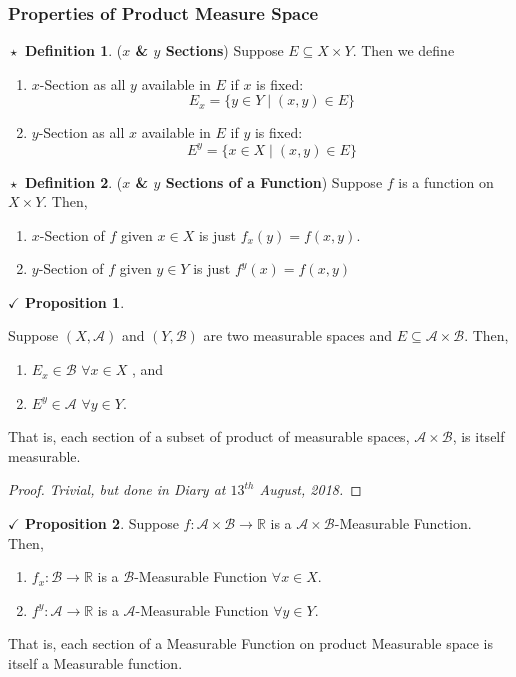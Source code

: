 \documentclass{article}
\theoremstyle{definition}
\newtheorem{definition}{$\boxed{\star}$ Definition}
\theoremstyle{remark}
\theoremstyle{definition}
\theoremstyle{definition}
\newtheorem{proposition}{$\checkmark$ Proposition}
\theoremstyle{definition}
\newcommand{\where}{\;\vert\;}
\newcommand{\R}{\mathbb{R}}
\newcommand{\alg}[1]{\mathscr{#1}}
\begin{document}
\subsubsection{Properties of Product Measure Space}
\begin{definition}
	(\textbf{$ x $ \& $  y $ Sections}) Suppose $ E\subseteq X\times Y $. Then we define
	\begin{enumerate}
		\item {$ x $-Section as all $ y $ available in $ E $ if $ x $ is fixed:
	\[E_x = \{y\in Y \where (x,y) \in E\}\]	
	}
		\item {$ y $-Section as all $ x $ available in $ E $ if $ y $ is fixed:
	\[E^y = \{x\in X \where (x,y) \in E\}\]	
}
	\end{enumerate}
\end{definition}
\hrulefill
\begin{definition}
	(\textbf{$ x $ \& $ y $ Sections of a Function}) Suppose $ f $ is a function on $ X\times Y $. Then,
	\begin{enumerate}
		\item {$ x $-Section of $ f $ given $ x\in X $ is just $ f_x(y) = f(x,y) $.	
	}
\item {$ y $-Section of $ f $ given $ y \in Y$ is just $ f^{y}(x) = f(x,y) $}
	\end{enumerate}
\end{definition}
\hrulefill
\begin{proposition}\label{P-43}

		{Suppose $ (X,\alg{A}) $ and $ (Y,\alg{B}) $ are two measurable spaces and $ E\subseteq \alg{A}\times \alg{B} $. Then,
			\begin{enumerate}
				\item {$ E_x \in \alg{B} $ $ \forall x\in X $ , and}
				\item {$ E^{y} \in \alg{A} $ $ \forall y\in Y $.}
			\end{enumerate}
			That is, each section of a subset of product of measurable spaces, $ \alg{A} \times \alg{B}$, is itself measurable.}

\end{proposition}
\begin{proof}
	 \emph{Trivial, but done in Diary at $ 13^{th} $ August, 2018.}
\end{proof}
\hrulefill
\begin{proposition}
	Suppose $ f : \alg{A}\times \alg{B} \longrightarrow \R$ is a $ \alg{A} \times \alg{B}$-Measurable Function. Then,
	\begin{enumerate}
		\item {$ f_x : \alg{B}\longrightarrow \R $ is a $ \alg{B} $-Measurable Function $ \forall x\in X $.}
		\item {$ f^y : \alg{A}\longrightarrow \R $ is a $ \alg{A} $-Measurable Function $ \forall y\in Y $.}
	\end{enumerate}
That is, each section of a Measurable Function on product Measurable space is itself a Measurable function.

\end{proposition}
\end{document}
